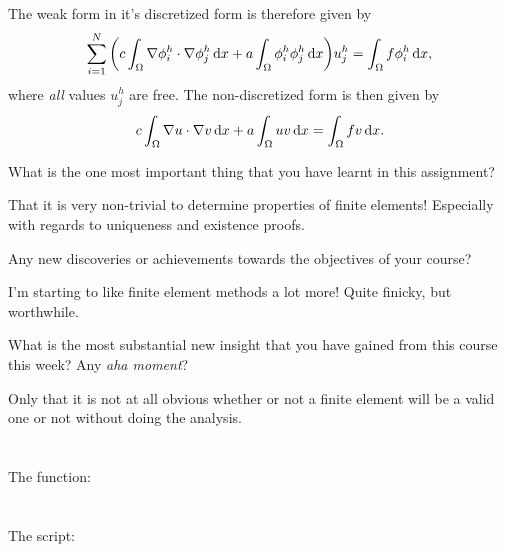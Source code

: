 \begin{problem}{2}
\begin{solution}
The weak form in it's discretized form is therefore given by
\begin{align*}
    \sum_{i=1}^N \bigg(
    c \int_\Omega \nabla \phi_i^h \cdot \nabla \phi_j^h \operatorname{d}\!{x} + 
    a \int_\Omega \phi_i^h \phi_j^h \operatorname{d}\!{x} 
    \bigg) u_j^h = 
    \int_\Omega f \phi_i^h \operatorname{d}\!{x},
\end{align*}
where \textit{all} values $u^h_j$ are free.
The non-discretized form is then given by
\begin{align}\label{LinElast_Weak}
c \int_\Omega \nabla u \cdot \nabla v \operatorname{d}\!{x} + 
a \int_\Omega u v \operatorname{d}\!{x} = 
\int_\Omega f v \operatorname{d}\!{x}.
\end{align}

\end{solution}
\pagebreak

\end{problem} %
\pagebreak


\begin{afterword}{}
What is the one most important thing that you have learnt in this assignment?
\vspace{0.2cm}

That it is very non-trivial to determine properties of finite elements!
Especially with regards to uniqueness and existence proofs.

\vspace{0.8cm}
Any new discoveries or achievements towards the objectives of your course?
\vspace{0.2cm}

I'm starting to like finite element methods a lot more!
Quite finicky, but worthwhile.

\vspace{0.8cm}
What is the most substantial new insight that you have gained from this course this week? Any \textit{aha moment}?
\vspace{0.2cm}

Only that it is not at all obvious whether or not a finite element will be a valid one or not without doing the analysis.

\end{afterword}

\pagebreak

\begin{appendices}
\lhead{}

\section{}\label{discLinElastCode}
The  function:
\pagebreak
\section{}\label{hw6Code}
The  script:

\end{appendices}


